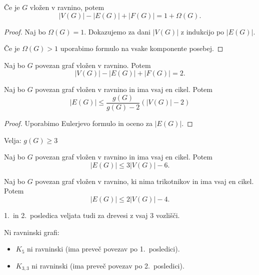 \begin{izrek}
    Če je $G$ vložen v ravnino, potem $$|V(G)| - |E(G)|+|F(G)| = 1 + \Omega (G).$$
\end{izrek}

\begin{proof}
    Naj bo $\Omega(G) = 1$. Dokazujemo za dani $|V(G)|$ z indukcijo po $|E(G)|$.

    Če je $\Omega(G) > 1$ uporabimo formulo na vsake komponente posebej.
\end{proof}

\begin{posledica}
    Naj bo $G$ povezan graf vložen v ravnino. Potem $$|V(G)| - |E(G)|+|F(G)| = 2.$$
\end{posledica}

\begin{trditev}
    Naj bo $G$ povezan graf vložen v ravnino in ima vsaj en cikel. Potem
    $$|E(G)| \leq \frac{g(G)}{g(G)-2}(|V(G)| - 2)$$
\end{trditev}

\begin{proof}
    Uporabimo Eulerjevo formulo in oceno za $|E(G)|$.
\end{proof}

\begin{opomba}
    Velja: $g(G) \geq 3$
\end{opomba}

\begin{posledica}
    Naj bo $G$ povezan graf vložen v ravnino in ima vsaj en cikel. Potem $$|E(G)| \leq 3|V(G)| - 6.$$
\end{posledica}

\begin{posledica}
     Naj bo $G$ povezan graf vložen v ravnino, ki nima trikotnikov in ima vsaj en cikel. Potem $$|E(G)| \leq 2|V(G)| - 4.$$
\end{posledica}

\begin{opomba}
    1.\ in 2.\ posledica veljata tudi za drevesi z vsaj 3 vozlišči.
\end{opomba}

\begin{primer}
    Ni ravninski grafi:
    \begin{itemize}
        \item $K_5$ ni ravninski (ima preveč povezav po 1.\ posledici).
        \item $K_{3,3}$ ni ravninski (ima preveč povezav po 2.\ posledici).
    \end{itemize}
\end{primer}

